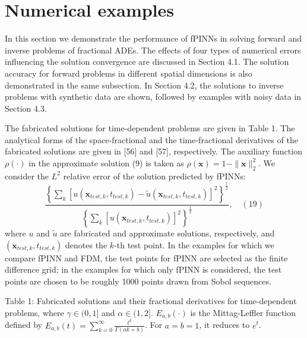 \documentclass[UTF8]{article}
\begin{document}
\section{Numerical examples}

In this section we demonstrate the performance of fPINNs in solving forward and inverse problems of fractional ADEs. The effects of four types of numerical errors influencing the solution convergence are discussed in Section 4.1. The solution accuracy for forward problems in different spatial dimensions is also demonstrated in the same subsection. In Section 4.2, the solutions to inverse problems with synthetic data are shown, followed by examples with noisy data in Section 4.3.

The fabricated solutions for time-dependent problems are given in Table 1. The analytical forms of the space-fractional and the time-fractional derivatives of the fabricated solutions are given in [56] and [57], respectively. The auxiliary function $\rho(\cdot)$ in the approximate solution (9) is taken as $\rho(\boldsymbol{x}) = 1 - \|\boldsymbol{x}\|_2^2$. We consider the $L^2$ relative error of the solution predicted by fPINNs:
$$
\frac{\left\{ \sum_k [u(\boldsymbol{x}_{test, k}, t_{test, k}) - \tilde{u}(\boldsymbol{x}_{test, k}, t_{test, k})]^2 \right\}^{\frac{1}{2}}}{\left\{ \sum_k [u(\boldsymbol{x}_{test, k}, t_{test, k})]^2 \right\}^{\frac{1}{2}}}, \quad (19)
$$
where $u$ and $\tilde{u}$ are fabricated and approximate solutions, respectively, and $(\boldsymbol{x}_{test, k}, t_{test, k})$ denotes the $k$-th test point. In the examples for which we compare fPINN and FDM, the test points for fPINN are selected as the finite difference grid; in the examples for which only fPINN is considered, the test points are chosen to be roughly 1000 points drawn from Sobol sequences.

Table 1: Fabricated solutions and their fractional derivatives for time-dependent problems, where $\gamma \in (0, 1]$ and $\alpha \in (1, 2]$. $E_{a,b}(\cdot)$ is the Mittag-Leffler function defined by $E_{a,b}(t) = \sum_{k=0}^{\infty} \frac{t^k}{\Gamma(ak+b)}$. For $a=b=1$, it reduces to $e^t$.
\end{document}
